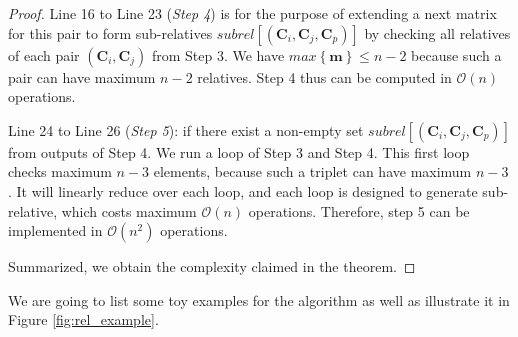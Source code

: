\begin{proof}
Line 16 to Line 23 (\textit{Step 4}) is for the purpose of extending
a next matrix for this pair to form sub-relatives $subrel\left[\left(\boldsymbol{C}_{i},\boldsymbol{C}_{j},\boldsymbol{C}_{p}\right)\right]$
by checking all relatives of each pair $\left(\boldsymbol{C}_{i},\boldsymbol{C}_{j}\right)$
from Step 3. We have $max\left\{ \boldsymbol{m}\right\} \leq n-2$
because such a pair can have maximum $n-2$ relatives. Step 4 thus
can be computed in $\mathcal{O}\left(n\right)$ operations.

Line 24 to Line 26 (\textit{Step 5}): if there exist a non-empty set
$subrel\left[\left(\boldsymbol{C}_{i},\boldsymbol{C}_{j},\boldsymbol{C}_{p}\right)\right]$
from outputs of Step 4. We run a loop of Step 3 and Step 4. This first
loop checks maximum $n-3$ elements, because such a triplet can have
maximum $n-3$. It will linearly reduce over each loop, and each loop
is designed to generate sub-relative, which costs maximum $\mathcal{O}\left(n\right)$
operations. Therefore, step 5 can be implemented in $\mathcal{O}\left(n^{2}\right)$
operations.

Summarized, we obtain the complexity claimed in the theorem.
\end{proof}
We are going to list some toy examples for the algorithm as well as
illustrate it in Figure \ref{fig:rel_example}.
